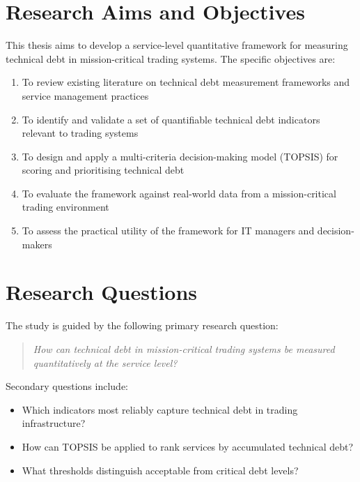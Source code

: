 \documentclass[
  11pt,
  letterpaper,
  11pt,
  oneside,
  english,
  onehalfspacing,
  headsepline]{MastersDoctoralThesis}
\providecommand{\tightlist}{%
  \setlength{\itemsep}{0pt}\setlength{\parskip}{0pt}}
\begin{document}
\section{Research Aims and
Objectives}\label{research-aims-and-objectives}

This thesis aims to develop a service-level quantitative framework for
measuring technical debt in mission-critical trading systems. The
specific objectives are:

\begin{enumerate}
\def\labelenumi{\arabic{enumi}.}
\tightlist
\item
  To review existing literature on technical debt measurement frameworks
  and service management practices
\item
  To identify and validate a set of quantifiable technical debt
  indicators relevant to trading systems
\item
  To design and apply a multi-criteria decision-making model (TOPSIS)
  for scoring and prioritising technical debt
\item
  To evaluate the framework against real-world data from a
  mission-critical trading environment
\item
  To assess the practical utility of the framework for IT managers and
  decision-makers
\end{enumerate}

\section{Research Questions}\label{research-questions}

The study is guided by the following primary research question:

\begin{quote}
\emph{How can technical debt in mission-critical trading systems be
measured quantitatively at the service level?}
\end{quote}

Secondary questions include:

\begin{itemize}
\tightlist
\item
  Which indicators most reliably capture technical debt in trading
  infrastructure?
\item
  How can TOPSIS be applied to rank services by accumulated technical
  debt?
\item
  What thresholds distinguish acceptable from critical debt levels?
\end{itemize}
\end{document}
